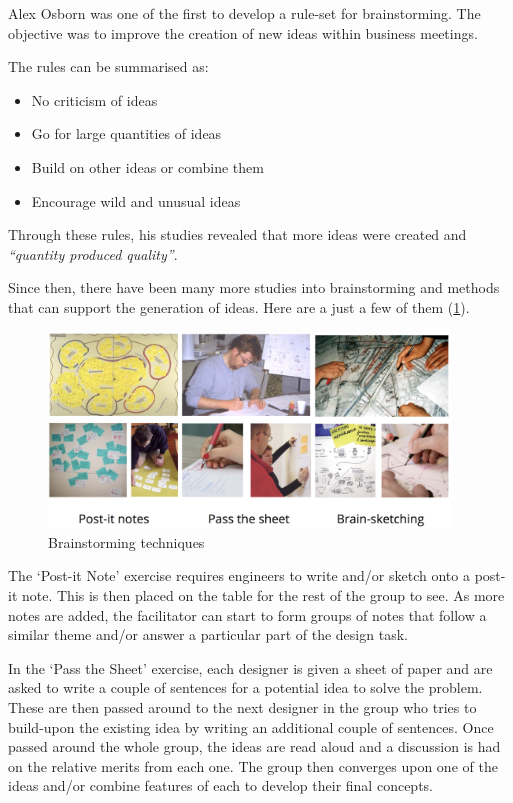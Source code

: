 Alex Osborn was one of the first to develop a rule-set for brainstorming. The objective was to improve the creation of new ideas within business meetings. 

The rules can be summarised as:

\begin{itemize}
  \item No criticism of ideas
  \item Go for large quantities of ideas
  \item Build on other ideas or combine them
  \item Encourage wild and unusual ideas
\end{itemize}

Through these rules, his studies revealed that more ideas were created and \emph{``quantity produced quality''}.

Since then, there have been many more studies into brainstorming and methods that can support the generation of ideas. Here are a just a few of them (\cref{fig-brainstorm}).

\begin{figure}[h!]
  \centering
  \includegraphics[width=0.95\textwidth]{figs/brainstorm.png}
  \caption{Brainstorming techniques}
  \label{fig-brainstorm}
\end{figure}


The `Post-it Note' exercise requires engineers to write and/or sketch onto a post-it note. This is then placed on the table for the rest of the group to see. As more notes are added, the facilitator can start to form groups of notes that follow a similar theme and/or answer a particular part of the design task.

In the `Pass the Sheet' exercise, each designer is given a sheet of paper and are asked to write a couple of sentences for a potential idea to solve the problem. These are then passed around to the next designer in the group who tries to build-upon the existing idea by writing an additional couple of sentences. Once passed around the whole group, the ideas are read aloud and a discussion is had on the relative merits from each one. The group then converges upon one of the ideas and/or combine features of each to develop their final concepts.

